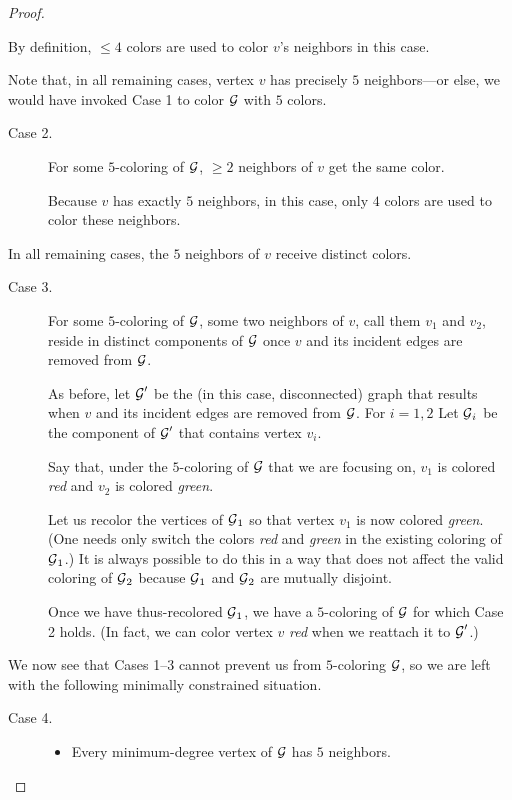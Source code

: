 \begin{proof}
\begin{description}
\smallskip

By definition, $\leq 4$ colors are used to color $v$'s neighbors in
this case.
\end{description}
Note that, in all remaining cases, vertex $v$ has precisely $5$
neighbors---or else, we would have invoked Case 1 to color $\mbox{$\cal G$}$ with
$5$ colors.
\begin{description}
\item[{\sf Case 2}.]
For some $5$-coloring of $\mbox{$\cal G$}$, $\geq 2$ neighbors of $v$ get the same
color.

\smallskip

Because $v$ has exactly $5$ neighbors, in this case, only $4$ colors
are used to color these neighbors.
\end{description}
In all remaining cases, the $5$ neighbors of $v$ receive distinct
colors.
\begin{description}
\item[{\sf Case 3}.]
For some $5$-coloring of $\mbox{$\cal G$}$, some two neighbors of $v$, call them
$v_1$ and $v_2$, reside in distinct components of $\mbox{$\cal G$}$ once $v$ and
its incident edges are removed from $\mbox{$\cal G$}$.

\smallskip

As before, let $\mbox{$\cal G$}'$ be the (in this case, disconnected) graph that
results when $v$ and its incident edges are removed from $\mbox{$\cal G$}$.  For $i
= 1,2$ Let $\mbox{$\cal G$}_i$ be the component of $\mbox{$\cal G$}'$ that contains vertex $v_i$.

Say that, under the $5$-coloring of $\mbox{$\cal G$}$ that we are focusing on,
$v_1$ is colored {\it red} and $v_2$ is colored {\it green}.

Let us recolor the vertices of $\mbox{$\cal G$}_1$ so that vertex $v_1$ is now colored
{\it green}.  (One needs only switch the colors {\it red} and {\it
  green} in the existing coloring of $\mbox{$\cal G$}_1$.)  It is always possible
to do this in a way that does not affect the valid coloring of $\mbox{$\cal G$}_2$
because $\mbox{$\cal G$}_1$ and $\mbox{$\cal G$}_2$ are mutually disjoint.

Once we have thus-recolored $\mbox{$\cal G$}_1$, we have a $5$-coloring of $\mbox{$\cal G$}$ for
which Case 2 holds.  (In fact, we can color vertex $v$ {\em red} when we
reattach it to $\mbox{$\cal G$}'$.)
\end{description}

\noindent
We now see that Cases 1--3 cannot prevent us from $5$-coloring $\mbox{$\cal G$}$, so
we are left with the following minimally constrained situation.
\begin{description}
\item[{\sf Case 4}.]
\begin{itemize}
\item
Every minimum-degree vertex of $\mbox{$\cal G$}$ has $5$ neighbors.


\end{itemize}
\end{description}
\end{proof}

